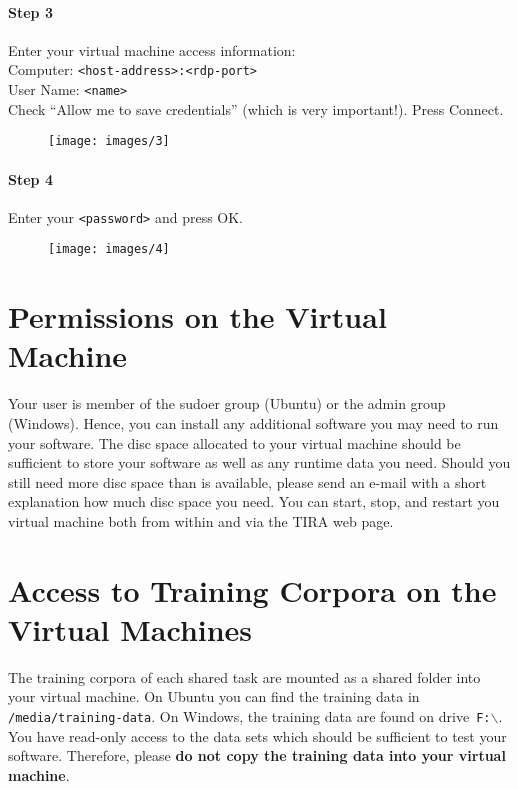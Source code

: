\pagebreak
\paragraph{Step 3}

Enter your virtual machine access information:\\
\indent Computer: \texttt{<host-address>:<rdp-port>}\\
\indent User Name: \texttt{<name>} \\
Check ``Allow me to save credentials'' (which is very important!). Press Connect.

\begin{figure}[H]
\centering
\texttt{[image: images/3]}
\label{fig3}
\end{figure}

\paragraph{Step 4}

Enter your \texttt{<password>} and press OK.

\begin{figure}[H]
\centering
\texttt{[image: images/4]}
\label{fig4}
\end{figure}

\section{Permissions on the Virtual Machine}

Your user is member of the sudoer group (Ubuntu) or the admin group (Windows). Hence, you can install any additional software you may need to run your software. The disc space allocated to your virtual machine should be sufficient to store your software as well as any runtime data you need. Should you still need more disc space than is available, please send an e-mail with a short explanation how much disc space you need. You can start, stop, and restart you virtual machine both from within and via the TIRA web page.

\section{Access to Training Corpora on the Virtual Machines}

The training corpora of each shared task are mounted as a shared folder into your virtual machine.
On Ubuntu you can find the training data in \texttt{/media/training-data}. On Windows, the training data are found on drive~\texttt{F:$\backslash$}.
You have read-only access to the data sets which should be sufficient to test your software. Therefore, please \textbf{do not copy the training data into your virtual machine}.

